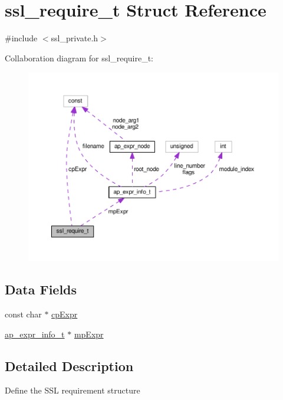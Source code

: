 \hypertarget{structssl__require__t}{}\section{ssl\+\_\+require\+\_\+t Struct Reference}
\label{structssl__require__t}


{\ttfamily \#include $<$ssl\+\_\+private.\+h$>$}



Collaboration diagram for ssl\+\_\+require\+\_\+t\+:
\nopagebreak
\begin{figure}[H]
\begin{center}
\leavevmode
\includegraphics[width=350pt]{structssl__require__t__coll__graph}
\end{center}
\end{figure}
\subsection*{Data Fields}
\begin{DoxyCompactItemize}
\item 
const char $\ast$ \hyperlink{structssl__require__t_a2962efcc68c46e9e245b13d9da0d5d78}{cp\+Expr}
\item 
\hyperlink{structap__expr__info__t}{ap\+\_\+expr\+\_\+info\+\_\+t} $\ast$ \hyperlink{structssl__require__t_aeb1fc4e09d8a8155db75ab259d93e92f}{mp\+Expr}
\end{DoxyCompactItemize}


\subsection{Detailed Description}
Define the S\+SL requirement structure 


